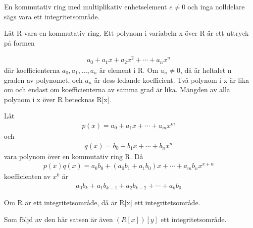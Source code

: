 \begin{definition}
En kommutativ ring med multiplikativ enhetselement $e \neq 0$ och inga
nolldelare sägs vara ett integritetsområde.
\end{definition}

\begin{definition}
Låt R vara en kommutativ ring. Ett polynom i variabeln x över R är ett uttryck
på formen

\begin{align*}
  a_0+a_1x+a_2x^2+\cdots+a_nx^n
\end{align*}
där koefficienterna $a_0, a_1,\dots,a_n$ är element i R. Om $a_n \neq 0$, då är
heltalet n graden av polynomet, och $a_n$ är dess ledande koefficient. Två
polynom i x är lika om och endast om koefficienterna av samma grad är lika.
Mängden av alla polynom i x över R betecknas R[x].
\end{definition}

\begin{definition}
Låt
\begin{align*}
  p(x) = a_0+a_1x+\cdots+a_mx^m
\end{align*}
och
\begin{align*}
  q(x) = b_0+b_1x+\cdots+b_nx^n
\end{align*}
vara polynom över en kommutativ ring R. Då
\begin{align*}
  p(x)q(x) = a_0b_0+(a_0b_1+a_1b_0)x+\cdots+a_mb_nx^{x+n}
\end{align*}
koefficienten av $x^k$ är
\begin{align*}
  a_0b_k+a_1b_{k-1}+a_2b_{k-2}+\cdots+a_kb_0
\end{align*}
\end{definition}

\begin{theorem}
Om R är ett integritetsområde, då är R[x] ett integritetsområde.
\end{theorem}

Som följd av den här satsen är även $(R[x])[y]$ ett integritetsområde.
